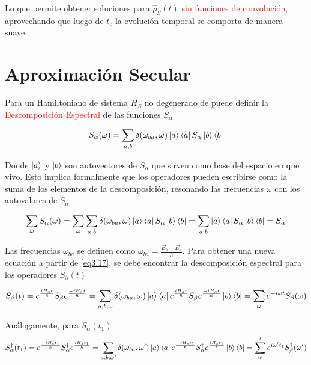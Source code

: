 \documentclass{book}
\begin{document}
Lo que permite obtener soluciones para $\hat{\rho}_S(t)$ \textcolor{red}{sin funciones de convolución}, aprovechando que luego de $t_c$ la evolución temporal se comporta de manera suave.

\section{Aproximación Secular}

Para un Hamiltoniano de sistema $H_S$ no degenerado de puede definir la \textcolor{red}{Descomposición Espectral} de las funciones $S_\alpha$

\begin{equation}\label{eq3.18}S_\alpha(\omega)=\sum_{a,b}\delta(\omega_{ba},\omega)\ket{a}\bra{a}S_\alpha\ket{b}\bra{b}\end{equation}

Donde $\ket{a}$ y $\ket{b}$ son autovectores de $S_\alpha$ que sirven como base del espacio en que vivo. Esto implica formalmente que los operadores pueden escribirse como la suma de los elementos de la descomposición, resonando las frecuencias $\omega$ con los autovalores de $S_\alpha$

\begin{equation}\label{eq3.19}\sum_\omega S_\alpha(\omega )= \sum_\omega \sum_{a,b}\delta(\omega_{ba},\omega)\ket{a}\bra{a}S_\alpha\ket{b}\bra{b}=\sum_{a,b}\ket{a}\bra{a}S_\alpha\ket{b}\bra{b}=S_\alpha\end{equation}

Las frecuencias $\omega_{ba}$ se definen como $\omega_{ba}=\frac{E_b-E_a}{\hslash}$. Para obtener una nueva ecuación a partir de \ref{eq3.17}, se debe encontrar la descomposición espectral para los operadores $S_\beta(t)$

\begin{equation}\label{eq3.20}S_\beta(t)=e^{\frac{iH_st}{\hslash}}S_\beta e^{\frac{-iH_st}{\hslash}}=\sum_{a,b,\omega}\delta(\omega_{ba},\omega)\ket{a}\bra{a}e^{\frac{iH_st}{\hslash}}S_\beta e^{\frac{-iH_st}{\hslash}}\ket{b}\bra{b}=\sum_\omega e^{-i\omega t} S_\beta(\omega) \end{equation}

Análogamente, para $S_\alpha^\dag(t_1)$
\begin{equation}\label{eq3.21}S_\alpha^\dag(t_1)=e^{\frac{-iH_st_1}{\hslash}}S_\alpha^\dag e^{\frac{iH_st_1}{\hslash}}=\sum_{a,b,\omega^\prime}\delta(\omega_{ba},\omega^\prime)\ket{a}\bra{a}e^{\frac{-iH_st_1}{\hslash}}S_\alpha^\dag e^{\frac{iH_st_1}{\hslash}}\ket{b}\bra{b}=\sum_\omega^\prime e^{i\omega^\prime t_1} S_\beta^\dag(\omega^\prime) \end{equation}
\end{document}
